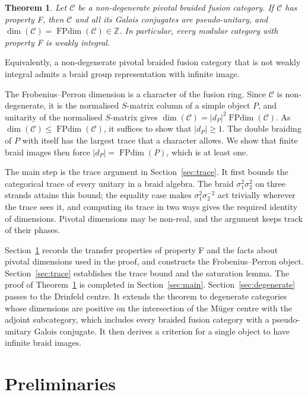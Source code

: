 \documentclass[11pt,oneside]{amsart}
\newtheorem{theorem}{Theorem}[section]
\theoremstyle{remark}
\newcommand{\C}{\mathcal C}
\newcommand{\FP}{\operatorname{FPdim}}
\newcommand{\Z}{\mathbb Z}
\begin{document}
\begin{theorem}\label{thm:main}
Let $\C$ be a non-degenerate pivotal braided fusion category. If $\C$ has
property F, then $\C$ and all its Galois conjugates are pseudo-unitary, and
$\dim(\C)=\FP(\C)\in\Z$. In particular, every modular category with property F
is weakly integral.
\end{theorem}

Equivalently, a non-degenerate pivotal braided fusion category that is not
weakly integral admits a braid group representation with infinite image.

The Frobenius--Perron dimension is a character of the fusion ring. Since $\C$
is non-degenerate, it is the normalised $S$-matrix column of a simple object
$P$, and unitarity of the normalised $S$-matrix gives $\dim(\C)=|d_P|^2\FP(\C)$.
As $\dim(\C)\le\FP(\C)$, it suffices to show that $|d_P|\ge1$. The double
braiding of $P$ with itself has the largest trace that a character allows. We
show that finite braid images then force $|d_P|=\FP(P)$, which is at least one.

The main step is the trace argument in Section~\ref{sec:trace}. It first bounds
the categorical trace of every unitary in a braid algebra. The braid
$\sigma_1^2\sigma_2^2$ on three strands attains this bound; the equality case
makes $\sigma_1^2\sigma_2^{-2}$ act trivially wherever the trace sees it, and
computing its trace in two ways gives the required identity of dimensions.
Pivotal dimensions may be non-real, and the argument keeps track of their
phases.

Section~\ref{sec:prelim} records the transfer properties of property F and the
facts about pivotal dimensions used in the proof, and constructs the
Frobenius--Perron object. Section~\ref{sec:trace} establishes the trace bound
and the saturation lemma. The proof of Theorem~\ref{thm:main} is completed in
Section~\ref{sec:main}. Section~\ref{sec:degenerate} passes to the Drinfeld
centre. It extends the theorem to degenerate categories whose dimensions are positive on the
intersection of the M\"uger centre with the adjoint subcategory, which includes
every braided fusion category with a pseudo-unitary Galois conjugate. It then
derives a criterion for a single object to have infinite braid images.

\section{Preliminaries}\label{sec:prelim}
\end{document}
